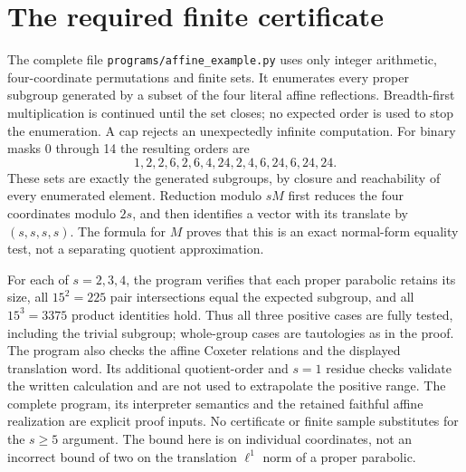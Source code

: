 \section*{The required finite certificate}
The complete file \texttt{programs/affine\_example.py} uses only
integer arithmetic, four-coordinate permutations and finite sets.
It enumerates every proper subgroup generated by a subset of the
four literal affine reflections. Breadth-first multiplication is
continued until the set closes; no expected order is used to stop
the enumeration. A cap rejects an unexpectedly infinite computation.
For binary masks 0 through 14 the resulting orders are
\[
 1,2,2,6,2,6,4,24,2,4,6,24,6,24,24.
\]
These sets are exactly the generated subgroups, by closure and
reachability of every enumerated element. Reduction modulo $sM$
first reduces the four coordinates modulo $2s$, and then identifies
a vector with its translate by $(s,s,s,s)$. The formula for $M$
proves that this is an exact normal-form equality test, not a
separating quotient approximation.

For each of $s=2,3,4$, the program verifies that each proper parabolic
retains its size, all $15^2=225$ pair intersections equal the expected
subgroup, and all $15^3=3375$ product identities hold. Thus all three
positive cases are fully tested, including the trivial subgroup;
whole-group cases are tautologies as in the proof. The program also
checks the affine Coxeter relations and the displayed translation
word. Its additional quotient-order and $s=1$ residue checks validate
the written calculation and are not used to extrapolate the positive
range. The complete program, its interpreter semantics and the
retained faithful affine realization are explicit proof inputs.
No certificate or finite sample substitutes for the $s\geq5$ argument.
The bound here is on individual coordinates, not an incorrect bound
of two on the translation $\ell^1$ norm of a proper parabolic.

